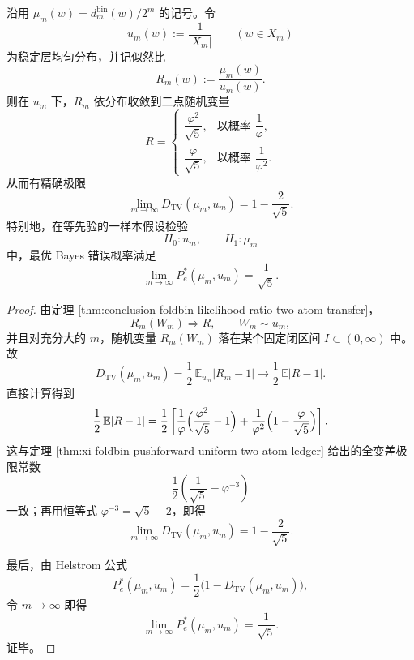 \begin{theorem}[与稳定层均匀分布的一样本最优判别常数]\label{thm:xi-fold-uniform-baseline-testing-constant}
沿用 \(\mu_m(w)=d_m^{\mathrm{bin}}(w)/2^m\) 的记号。令
\[
u_m(w):=\frac{1}{|X_m|}
\qquad (w\in X_m)
\]
为稳定层均匀分布，并记似然比
\[
R_m(w):=\frac{\mu_m(w)}{u_m(w)}.
\]
则在 \(u_m\) 下，\(R_m\) 依分布收敛到二点随机变量
\[
R=
\begin{cases}
\dfrac{\varphi^2}{\sqrt5},& \text{以概率 }\dfrac1\varphi,\\[8pt]
\dfrac{\varphi}{\sqrt5},& \text{以概率 }\dfrac1{\varphi^2}.
\end{cases}
\]
从而有精确极限
\[
\boxed{\;
\lim_{m\to\infty}D_{\mathrm{TV}}(\mu_m,u_m)
=
1-\frac{2}{\sqrt5}.\;}
\]
特别地，在等先验的一样本假设检验
\[
H_0:u_m,
\qquad
H_1:\mu_m
\]
中，最优 Bayes 错误概率满足
\[
\boxed{\;
\lim_{m\to\infty}P_e^\ast(\mu_m,u_m)
=
\frac1{\sqrt5}.\;}
\]
\end{theorem}
\begin{proof}
由定理 \ref{thm:conclusion-foldbin-likelihood-ratio-two-atom-transfer}，
\[
R_m(W_m)\Rightarrow R,
\qquad
W_m\sim u_m,
\]
并且对充分大的 \(m\)，随机变量 \(R_m(W_m)\) 落在某个固定闭区间 \(I\subset(0,\infty)\) 中。故
\[
D_{\mathrm{TV}}(\mu_m,u_m)
=
\frac12\,\mathbb E_{u_m}|R_m-1|
\longrightarrow
\frac12\,\mathbb E|R-1|.
\]
直接计算得到
\[
\frac12\,\mathbb E|R-1|
=
\frac12\left[
\frac1\varphi\Bigl(\frac{\varphi^2}{\sqrt5}-1\Bigr)
+
\frac1{\varphi^2}\Bigl(1-\frac{\varphi}{\sqrt5}\Bigr)
\right].
\]
这与定理 \ref{thm:xi-foldbin-pushforward-uniform-two-atom-ledger} 给出的全变差极限常数
\[
\frac12\left(\frac1{\sqrt5}-\varphi^{-3}\right)
\]
一致；再用恒等式 \(\varphi^{-3}=\sqrt5-2\)，即得
\[
\lim_{m\to\infty}D_{\mathrm{TV}}(\mu_m,u_m)=1-\frac{2}{\sqrt5}.
\]

最后，由 Helstrom 公式
\[
P_e^\ast(\mu_m,u_m)=\frac12\bigl(1-D_{\mathrm{TV}}(\mu_m,u_m)\bigr),
\]
令 \(m\to\infty\) 即得
\[
\lim_{m\to\infty}P_e^\ast(\mu_m,u_m)=\frac1{\sqrt5}.
\]
证毕。
\end{proof}

